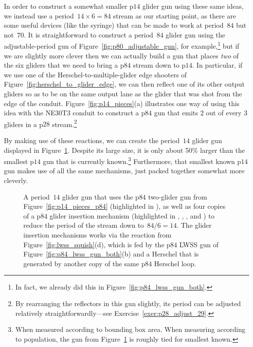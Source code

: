 In order to construct a somewhat smaller p$14$ glider gun using these same ideas, we instead use a period~$14 \times 6 = 84$ stream as our starting point, as there are some useful devices (like the syringe) that can be made to work at period~$84$ but not~$70$. It is straightforward to construct a period~$84$ glider gun using the adjustable-period gun of Figure~\ref{fig:p80_adjustable_gun}, for example,\footnote{In fact, we already did this in Figure~\ref{fig:p84_lwss_gun_both}.} but if we are slightly more clever then we can actually build a gun that places \emph{two} of the six gliders that we need to bring a p$84$ stream down to p$14$. In particular, if we use one of the Herschel-to-multiple-glider edge shooters of Figure~\ref{fig:herschel_to_glider_edge}, we can then reflect one of its other output gliders so as to be on the same output lane as the glider that was shot from the edge of the conduit. Figure~\ref{fig:p14_pieces}(a) illustrates one way of using this idea with the NE30T3 conduit to construct a p$84$ gun that emits $2$ out of every $3$ gliders in a p$28$ stream.\footnote{By rearranging the reflectors in this gun slightly, its period can be adjusted relatively straightforwardly---see Exercise~\ref{exer:p28_adjust_29}.}

By making use of these reactions, we can create the period~$14$ glider gun displayed in Figure~\ref{fig:p14_gun}. Despite its large size, it is only about 50\% larger than the smallest p$14$ gun that is currently known.\footnote{When measured according to bounding box area. When measuring according to population, the gun from Figure~\ref{fig:p14_gun} is roughly tied for smallest known.} Furthermore, that smallest known p$14$ gun makes use of all the same mechanisms, just packed together somewhat more cleverly.

\begin{figure}[!p]
	\centering
	\caption{A period~$14$ glider gun that uses the p$84$ two-glider gun from Figure~\ref{fig:p14_pieces_p84} (highlighted in ), as well as four copies of a p$84$ glider insertion mechanism (highlighted in , , , and ) to reduce the period of the stream down to~$84/6 = 14$. The glider insertion mechanisms works via the reaction from Figure~\ref{fig:lwss_squish}(d), which is fed by the p$84$ LWSS gun of Figure~\ref{fig:p84_lwss_gun_both}(b) and a Herschel that is generated by another copy of the same p$84$ Herschel loop.}\label{fig:p14_gun}
\end{figure}



